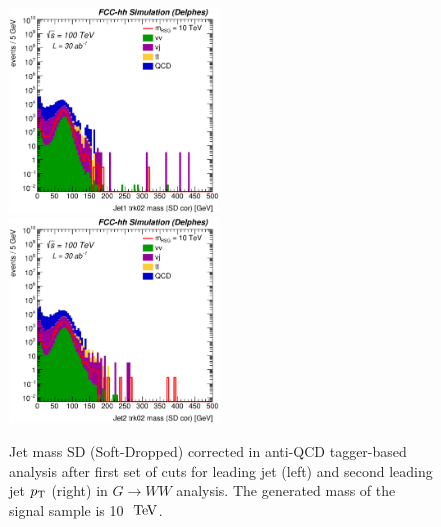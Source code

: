 \documentclass{cernrep}
\begin{document}
\begin{figure}[!htb]\centering
\includegraphics[width=0.495\textwidth]{Fig/RSGww/Jet1_trk02_SD_Cor_m_sel3_nostack_log.eps}
\includegraphics[width=0.495\textwidth]{Fig/RSGww/Jet2_trk02_SD_Cor_m_sel3_nostack_log.eps}
\caption{Jet mass SD (Soft-Dropped) corrected in anti-QCD tagger-based analysis after first set of cuts for leading jet (left) and second leading jet $p\sb{\scriptstyle\mathrm{T}}$ (right) in $G \rightarrow WW$ analysis. The generated mass of the signal sample is 10 $\TeV$.}
\label{fig:RSGww_sel1_tagger}
\end{figure}
\end{document}
